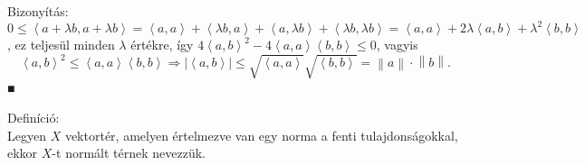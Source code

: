 \documentclass[12pt,a4paper]{scrartcl}
\newenvironment{definicio}{}{}
\newenvironment{bizonyitas}{}{}
\begin{document}
\begin{bizonyitas}

Bizonyítás:\\
\(0 \leq \left\langle {a + \lambda b,a + \lambda b} \right\rangle = \left\langle {a,a} \right\rangle + \left\langle {\lambda b,a} \right\rangle + \left\langle {a,\lambda b} \right\rangle + \left\langle {\lambda b,\lambda b} \right\rangle = \left\langle {a,a} \right\rangle + 2\lambda\left\langle {a,b} \right\rangle + \lambda^{2}\left\langle {b,b} \right\rangle\),
ez teljesül minden \(\lambda\) értékre, így
\(4\left\langle {a,b} \right\rangle^{2} - 4\left\langle {a,a} \right\rangle\left\langle {b,b} \right\rangle \leq 0\),
vagyis
\[\left. \left\langle {a,b} \right\rangle^{2} \leq \left\langle {a,a} \right\rangle\left\langle {b,b} \right\rangle\Rightarrow\left| \left\langle {a,b} \right\rangle \right| \leq \sqrt{\left\langle {a,a} \right\rangle}\sqrt{\left\langle {b,b} \right\rangle} = \left\| a \right\| \cdot \left\| b \right\|. \right.\]
■

\end{bizonyitas}

\begin{definicio}

Definíció:\\
Legyen \(X\) vektortér, amelyen értelmezve van egy norma a fenti
tulajdonságokkal, ekkor \(X\)-t normált térnek nevezzük.

\end{definicio}
\end{document}
